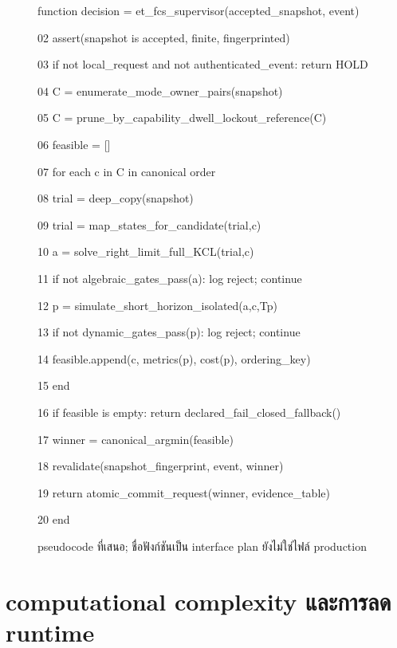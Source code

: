 \documentclass[12pt,a4paper]{article}
\begin{document}
\begin{figure}[H]
\small
\begin{minipage}{.94\textwidth}
  function decision = et\_fcs\_supervisor(accepted\_snapshot, event)\par
02  assert(snapshot is accepted, finite, fingerprinted)\par
03  if not local\_request and not authenticated\_event: return HOLD\par
04  C = enumerate\_mode\_owner\_pairs(snapshot)\par
05  C = prune\_by\_capability\_dwell\_lockout\_reference(C)\par
06  feasible = []\par
07  for each c in C in canonical order\par
08      trial = deep\_copy(snapshot)\par
09      trial = map\_states\_for\_candidate(trial,c)\par
10      a = solve\_right\_limit\_full\_KCL(trial,c)\par
11      if not algebraic\_gates\_pass(a): log reject; continue\par
12      p = simulate\_short\_horizon\_isolated(a,c,Tp)\par
13      if not dynamic\_gates\_pass(p): log reject; continue\par
14      feasible.append(c, metrics(p), cost(p), ordering\_key)\par
15  end\par
16  if feasible is empty: return declared\_fail\_closed\_fallback()\par
17  winner = canonical\_argmin(feasible)\par
18  revalidate(snapshot\_fingerprint, event, winner)\par
19  return atomic\_commit\_request(winner, evidence\_table)\par
20  end\par
\end{minipage}
\caption{pseudocode ที่เสนอ; ชื่อฟังก์ชันเป็น interface plan ยังไม่ใช่ไฟล์ production}
\end{figure}

\section{computational complexity และการลด runtime}
\end{document}
